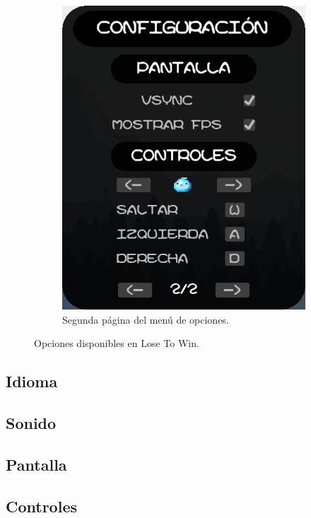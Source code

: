 \documentclass[12pt, spanish]{article}
\begin{document}
\begin{figure}[H]
\begin{subfigure}[b]{0.49\textwidth}
		\includegraphics[width=\textwidth]{"opciones/pagina2_opciones.png"}
		\caption{Segunda página del menú de opciones.}\label{fig:pagina2_opciones}
   \end{subfigure}
	\caption{Opciones disponibles en Lose To Win.}\label{fig:opciones}
\end{figure}

\subsection{Idioma}

\subsection{Sonido}

\subsection{Pantalla}

\subsection{Controles}
\end{document}

